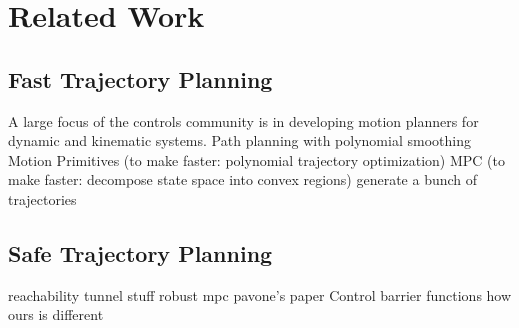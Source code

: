 \section{Related Work \label{sec:relatedwork}}
\subsection{Fast Trajectory Planning}
A large focus of the controls community is in developing motion planners for dynamic and kinematic systems. 
Path planning with polynomial smoothing
Motion Primitives (to make faster: polynomial trajectory optimization)
MPC (to make faster: decompose state space into convex regions)
generate a bunch of trajectories
\subsection{Safe Trajectory Planning}
reachability
tunnel stuff
robust mpc
pavone's paper
Control barrier functions
how ours is different
